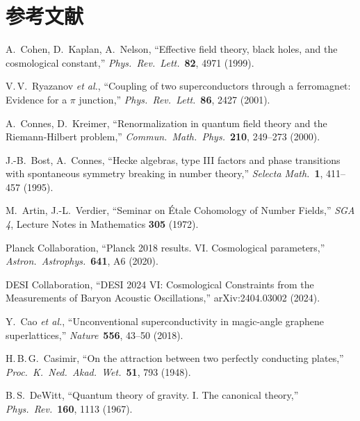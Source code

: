 \newpage
\section*{参考文献}

\begin{enumerate}[label={[\arabic*]}]
\item A.~Cohen, D.~Kaplan, A.~Nelson,
  ``Effective field theory, black holes, and the cosmological constant,''
  \textit{Phys.\ Rev.\ Lett.}\ \textbf{82}, 4971 (1999).
  \label{ref:CKN}

\item V.\,V.~Ryazanov \textit{et al.},
  ``Coupling of two superconductors through a ferromagnet:
  Evidence for a $\pi$ junction,''
  \textit{Phys.\ Rev.\ Lett.}\ \textbf{86}, 2427 (2001).

\item A.~Connes, D.~Kreimer,
  ``Renormalization in quantum field theory and the Riemann-Hilbert problem,''
  \textit{Commun.\ Math.\ Phys.}\ \textbf{210}, 249--273 (2000).

\item J.-B.~Bost, A.~Connes,
  ``Hecke algebras, type III factors and phase transitions with
  spontaneous symmetry breaking in number theory,''
  \textit{Selecta Math.}\ \textbf{1}, 411--457 (1995).

\item M.~Artin, J.-L.~Verdier,
  ``Seminar on \'Etale Cohomology of Number Fields,''
  \textit{SGA 4}, Lecture Notes in Mathematics \textbf{305} (1972).

\item Planck Collaboration,
  ``Planck 2018 results. VI. Cosmological parameters,''
  \textit{Astron.\ Astrophys.}\ \textbf{641}, A6 (2020).

\item DESI Collaboration,
  ``DESI 2024 VI: Cosmological Constraints from the Measurements of
  Baryon Acoustic Oscillations,'' arXiv:2404.03002 (2024).

\item Y.~Cao \textit{et al.},
  ``Unconventional superconductivity in magic-angle graphene superlattices,''
  \textit{Nature}\ \textbf{556}, 43--50 (2018).

\item H.\,B.\,G.~Casimir,
  ``On the attraction between two perfectly conducting plates,''
  \textit{Proc.\ K.\ Ned.\ Akad.\ Wet.}\ \textbf{51}, 793 (1948).

\item B.\,S.~DeWitt,
  ``Quantum theory of gravity. I. The canonical theory,''
  \textit{Phys.\ Rev.}\ \textbf{160}, 1113 (1967).
\end{enumerate}

